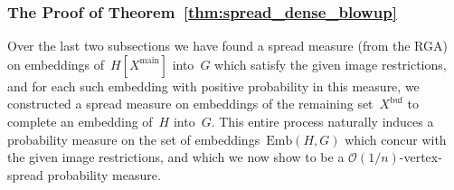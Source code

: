 \documentclass[final]{article}
\theoremstyle{definition}
\newcommand{\main}{\mathrm{main}}
\newcommand{\buf}{\mathrm{buf}}
\newcommand{\Emb}{\mathrm{Emb}}
\begin{document}
\subsubsection*{The Proof of Theorem~\ref{thm:spread_dense_blowup}}

Over the last two subsections we have found a spread measure (from the RGA) on embeddings of~$H[X^\main]$ into~$G$ which satisfy the given image restrictions, and for each such embedding with positive probability in this measure, we constructed a spread measure on embeddings of the remaining set~$X^\buf$ to complete an embedding of~$H$ into~$G$. This entire process naturally induces a probability measure on the set of embeddings~$\Emb(H, G)$ which concur with the given image restrictions, and which we now show to be a $\mathcal{O}(1/n)$-vertex-spread probability measure. 
\end{document}
